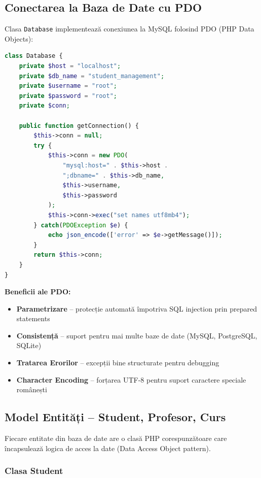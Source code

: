 \subsection{Conectarea la Baza de Date cu PDO}

Clasa \texttt{Database} implementează conexiunea la MySQL folosind PDO (PHP Data Objects):

\begin{lstlisting}[language=PHP]
class Database {
    private $host = "localhost";
    private $db_name = "student_management";
    private $username = "root";
    private $password = "root";
    private $conn;

    public function getConnection() {
        $this->conn = null;
        try {
            $this->conn = new PDO(
                "mysql:host=" . $this->host .
                ";dbname=" . $this->db_name,
                $this->username,
                $this->password
            );
            $this->conn->exec("set names utf8mb4");
        } catch(PDOException $e) {
            echo json_encode(['error' => $e->getMessage()]);
        }
        return $this->conn;
    }
}
\end{lstlisting}

\textbf{Beneficii ale PDO:}

\begin{itemize}
    \item \textbf{Parametrizare} – protecție automată împotriva SQL injection prin prepared statements
    \item \textbf{Consistență} – suport pentru mai multe baze de date (MySQL, PostgreSQL, SQLite)
    \item \textbf{Tratarea Erorilor} – excepții bine structurate pentru debugging
    \item \textbf{Character Encoding} – forțarea UTF-8 pentru suport caractere speciale românești
\end{itemize}

\subsection{Model Entități – Student, Profesor, Curs}

Fiecare entitate din baza de date are o clasă PHP corespunzătoare care încapsulează logica de acces la date (Data Access Object pattern).

\subsubsection{Clasa Student}

